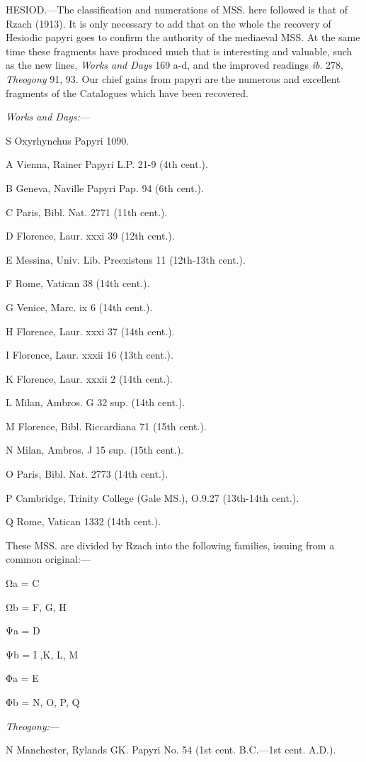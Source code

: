 HESIOD.—The classification and numerations of MSS. here followed is that
of Rzach (1913). It is only necessary to add that on the whole the recovery of
Hesiodic papyri goes to confirm the authority of the mediaeval MSS. At the same
time these fragments have produced much that is interesting and valuable, such
as the new lines, \emph{Works and Days} 169 a-d, and the improved readings
\emph{ib}. 278, \emph{Theogony} 91, 93. Our chief gains from papyri are the
numerous and excellent fragments of the Catalogues which have been recovered.

\emph{Works and Days:}—

S Oxyrhynchus Papyri 1090.

A Vienna, Rainer Papyri L.P. 21-9 (4th cent.).

B Geneva, Naville Papyri Pap. 94 (6th cent.).

C Paris, Bibl. Nat. 2771 (11th cent.).

D Florence, Laur. xxxi 39 (12th cent.).

E Messina, Univ. Lib. Preexistens 11 (12th-13th cent.).

F Rome, Vatican 38 (14th cent.).

G Venice, Marc. ix 6 (14th cent.).

H Florence, Laur. xxxi 37 (14th cent.).

I Florence, Laur. xxxii 16 (13th cent.).

K Florence, Laur. xxxii 2 (14th cent.).

L Milan, Ambros. G 32 sup. (14th cent.).

M Florence, Bibl. Riccardiana 71 (15th cent.).

N Milan, Ambros. J 15 sup. (15th cent.).

O Paris, Bibl. Nat. 2773 (14th cent.).

P Cambridge, Trinity College (Gale MS.), O.9.27 (13th-14th cent.).

Q Rome, Vatican 1332 (14th cent.).

These MSS. are divided by Rzach into the following families, issuing from a
common original:—

Ωa = C

Ωb = F, G, H

Ψa = D

Ψb = I ,K, L, M

Φa = E

Φb = N, O, P, Q

\emph{Theogony:}—

N Manchester, Rylands GK. Papyri No. 54 (1st cent. B.C.—1st cent. A.D.).

